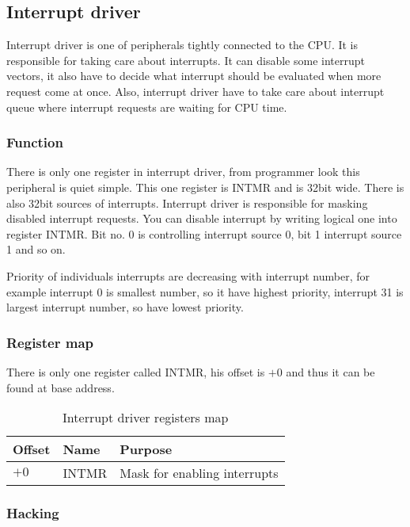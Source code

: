 \subsection{Interrupt driver}

Interrupt driver is one of peripherals tightly connected to the CPU. It is
responsible for taking care about interrupts. It can disable some interrupt
vectors, it also have to decide what interrupt should be evaluated when more
request come at once. Also, interrupt driver have to take care about interrupt
queue where interrupt requests are waiting for CPU time.

\subsubsection{Function}

There is only one register in interrupt driver, from programmer look this
peripheral is quiet simple. This one register is INTMR and is 32bit wide. There
is also 32bit sources of interrupts. Interrupt driver is responsible for
masking disabled interrupt requests. You can disable interrupt by writing
logical one into register INTMR. Bit no. 0 is controlling interrupt source 0,
bit 1 interrupt source 1 and so on.

Priority of individuals interrupts are decreasing with interrupt number, for
example interrupt 0 is smallest number, so it have highest priority, interrupt
31 is largest interrupt number, so have lowest priority.

\subsubsection{Register map}

There is only one register called INTMR, his offset is $+0$ and thus it can be
found at base address.

\begin{table}[h]
    \centering
    \begin{tabular}{|l|l|l|}
        \hline
        \textbf{Offset} & \textbf{Name} & \textbf{Purpose}             \\ \hline
        $+0$            & INTMR         & Mask for enabling interrupts \\ \hline
    \end{tabular}
    \caption{Interrupt driver registers map}
    \label{tab:int_driver_reg_map}
\end{table}

\subsubsection{Hacking}

